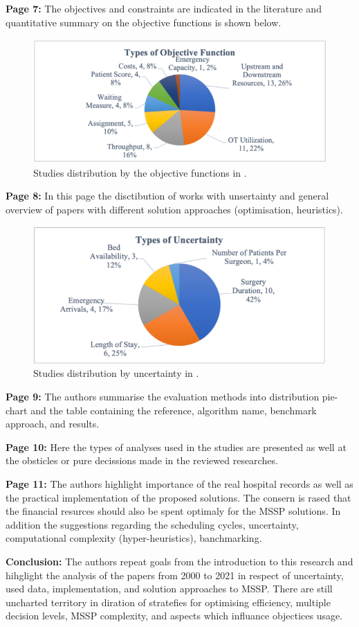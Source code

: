     \textbf{Page 7:}
    The objectives and constraints are indicated in the literature and quantitative summary on the objective functions is shown below.
    \begin{figure}[H]
        \centering
        \includegraphics[width=.8\textwidth]{figures/0007_SR01MY22/fig4.png}
        \caption{Studies distribution by the objective functions in \cite{x236}.}
        \label{fig4:0007_SR01MY22}
    \end{figure}

    \textbf{Page 8:}
    In this page the disctibution of works with unsertainty and general overview of papers with different solution approaches (optimisation, heuristics).
    \begin{figure}[H]
        \centering
        \includegraphics[width=.8\textwidth]{figures/0007_SR01MY22/fig5.png}
        \caption{Studies distribution by uncertainty in \cite{x236}.}
        \label{fig5:0007_SR01MY22}
    \end{figure}

    \textbf{Page 9:}
    The authors summarise the evaluation methods into distribution pie-chart and the table containing the reference, algorithm name, benchmark approach, and results.
    
    \textbf{Page 10:}
    Here the types of analyses used in the studies are presented as well at the obsticles or pure decissions made in the reviewed researches.
    
    \textbf{Page 11:}
    The authors highlight importance of the real hospital records as well as the practical implementation of the proposed solutions. The consern is rased that the financial resurces should also be spent optimaly for the MSSP solutions. In addition the suggestions regarding the scheduling cycles, uncertainty, computational complexity (hyper-heuristics), banchmarking.
    
    \textbf{Conclusion:}
    The authors repeat goals from the introduction to this research and hihglight the analysis of the papers from 2000 to 2021 in respect of uncertainty, used data, implementation, and solution approaches to MSSP. There are still uncharted territory in diration of stratefies for optimising efficiency, multiple decision levels, MSSP complexity, and aspects which influance objectices usage.